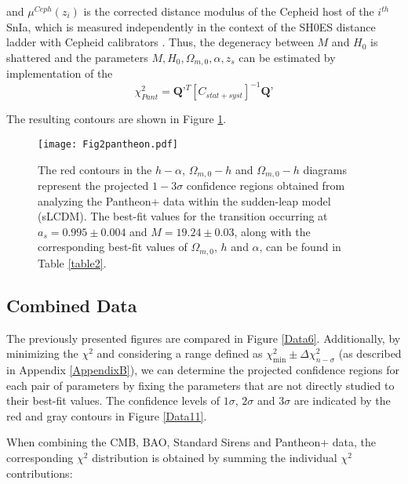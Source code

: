 \documentclass[universe,article,accept,moreauthors,pdftex]{Definitions/mdpi}
\begin{document}
 \noindent and $\mu^{Ceph}(z_{i})$ is the corrected distance modulus of the Cepheid host of the $i^{th}$ SnIa, which is measured independently in the
context of the SH0ES distance ladder with Cepheid calibrators \cite{Riess:2021jrx}. Thus, the degeneracy between $M$ and $H_0$ is shattered and the parameters $M, H_0, \Omega_{m,0},\alpha,z_{s}$ can be estimated by implementation of the 
  \begin{equation}
  \chi^{2}_{Pant}=\textbf{Q'}^{T} [C_{stat+syst}]^{-1}\textbf{Q'}
  \end{equation}
  
 
The resulting contours  are shown in Figure \ref{Data4}.

  \begin{figure}[H] 
    \texttt{[image: Fig2pantheon.pdf]}
    \caption{{The red} %
 contours in the $h-\alpha$, $\Omega_{m,0}-h$ and $\Omega_{m,0}-h$ diagrams represent the projected $1-3\sigma$ confidence regions obtained from analyzing the Pantheon+ data within the sudden-leap model (sLCDM). The best-fit values for the transition occurring at $a_{s}=0.995\pm 0.004$ and $M =19.24\pm 0.03$, along with the corresponding best-fit values of $\Omega_{m,0}$, $h$ and $\alpha$, can be found in Table \ref{table2}. }
    \label{Data4}
\end{figure}


\subsection{Combined Data}\label{subsec:3.4}

 
 The previously presented figures are compared in Figure \ref{Data6}. Additionally, by minimizing the $\chi^2$ and considering a range defined as $\chi^2_{\text{min}}\pm\Delta \chi_{n-\sigma}^2$ (as described in Appendix \ref{AppendixB}), we can determine the projected confidence regions for each pair of parameters by fixing the parameters that are not directly studied to their best-fit values. The confidence levels of $1\sigma$, $2\sigma$ and $3\sigma$ are indicated by the red and gray contours in Figure \ref{Data11}.

When combining the CMB, BAO, Standard Sirens and Pantheon+ data, the corresponding $\chi^2$ distribution is obtained by summing the individual $\chi^2$ contributions:
\end{document}
